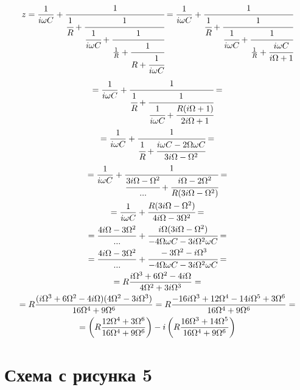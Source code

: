 \begin{equation}
	z=\frac{1}{i\omega C}+
	\cfrac{1}{
		\cfrac{1}{R}+
		\cfrac{1}{
			\cfrac{1}{i\omega C}+
			\cfrac{1}{
				\frac{1}{R}+
					\cfrac{1}{
						R+
						\cfrac{1}{
							i\omega C				
						}
					}
				}
			}		
			}=
\frac{1}{i\omega C}+
	\cfrac{1}{
		\cfrac{1}{R}+
		\cfrac{1}{
			\cfrac{1}{i\omega C}+
			\cfrac{1}{
				\frac{1}{R}+
					\cfrac{i\omega C}{i\Omega+1}
				}
			}		
			}
\end{equation}
\begin{gather}
=
\frac{1}{i\omega C}+
	\cfrac{1}{
		\cfrac{1}{R}+
		\cfrac{1}{
			\cfrac{1}{i\omega C}+
			\cfrac{R(i\Omega+1)}{2i\Omega+1}	
		}	
	}
=\\=
\frac{1}{i\omega C}+
	\cfrac{1}{
		\cfrac{1}{R}+		
			\cfrac{i\omega C - 2\Omega \omega C}{3i\Omega-\Omega^2}
	}
=\\=
\frac{1}{i\omega C}+
	\cfrac{1}{
		\cfrac{3i\Omega-\Omega^2}{...}+		
			\cfrac{i\Omega - 2\Omega^2}{R(3i\Omega-\Omega^2)}
	}
=\\=
\frac{1}{i\omega C}+
\cfrac{R(3i\Omega-\Omega^2)}{4i\Omega - 3\Omega^2}
=\\=
\frac{4i\Omega - 3\Omega^2}{...}+
\cfrac{i\Omega(3i\Omega-\Omega^2)}{-4\Omega\omega C - 3i\Omega^2\omega C}
=\\=
\frac{4i\Omega - 3\Omega^2}{...}+
\cfrac{-3\Omega^2-i\Omega^3}{-4\Omega\omega C - 3i\Omega^2\omega C}
=\\=
R\frac{
	i\Omega^3
	+6\Omega^2
	-4i\Omega 
}{
	4\Omega^2 
	+3i\Omega^3
}
=\\=
R\frac{
	(i\Omega^3
	+6\Omega^2
	-4i\Omega )
	(
		4\Omega^2 
		-3i\Omega^3	
	)
}{
	16\Omega^4
	+9\Omega^6
}
=R\frac{
	-16 i \Omega^3 + 12 \Omega^4 - 14 i \Omega^5 + 3 \Omega^6
}{
	16\Omega^4
	+9\Omega^6
}
=\\=
\left(
R
	\frac{
		12 \Omega^4 + 3 \Omega^6
	}{
		16\Omega^4
		+9\Omega^6
	}
\right)
-i
\left(
	R\frac{
		16 \Omega^3 + 14 \Omega^5
	}{
		16\Omega^4
		+9\Omega^6
	}
\right)
\end{gather}

\section{Схема с рисунка 5}
\begin{center}

\end{center}

